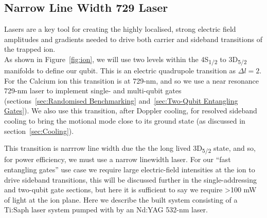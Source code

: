     
\subsection{Narrow Line Width 729 Laser}
\label{sec:Narrow Line Width 729 Laser} 

    Lasers are a key tool for creating the highly localised, strong electric
    field amplitudes and gradients needed to drive both carrier and sideband
    transitions of the trapped ion.\\ As shown in Figure~\ref{fig:ion}, we will
    use two levels within the 4S\textsubscript{1/2} to 3D\textsubscript{5/2}
    manifolds to define our qubit. This is an electric quadrupole transition as
    $\Delta l = 2$.  For the Calcium ion this transition is at 729-nm, and so we
    use a near resonance 729-nm laser to implement single- and multi-qubit gates
    (sections~\ref{sec:Randomised Benchmarking} and~\ref{sec:Two-Qubit
    Entangling Gates}). We also use this transition, after Doppler cooling, for
    resolved sideband cooling to bring the motional mode close to its ground
    state (as discussed in section~\ref{sec:Cooling}).

    This transition is narrrow line width due the the long lived
    3D\textsubscript{5/2} state, and so, for power efficiency, we must use a
    narrow linewidth laser. For our ``fast entangling gates'' use case we
    require large electric-field intensities at the ion to drive sideband
    transitions, this will be discussed further in the single-addressing and
    two-qubit gate sections, but here it is sufficient to say we require >100 mW
    of light at the ion plane.  Here we describe the built system 
    consisting of a Ti:Saph laser system pumped with by an Nd:YAG 532-nm laser.\\

